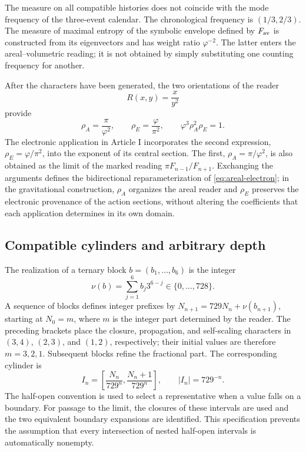 The measure on all compatible histories does not coincide with the mode frequency of the three-event calendar. The chronological frequency is \((1/3,2/3)\). The measure of maximal entropy of the symbolic envelope defined by \(F_{\rm av}\) is constructed from its eigenvectors and has weight ratio \(\varphi^{-2}\). The latter enters the areal--volumetric reading; it is not obtained by simply substituting one counting frequency for another.

After the characters have been generated, the two orientations of the reader
\[
 R(x,y)=\frac{x}{y^2}
\]
provide
\begin{equation}
 \rho_A=\frac\pi{\varphi^2},\qquad
 \rho_E=\frac\varphi{\pi^2},\qquad
 \varphi^3\rho_A^2\rho_E=1.
 \label{eq:areal-electron}
\end{equation}
The electronic application in Article I incorporates the second expression,
\(\rho_E=\varphi/\pi^2\), into the exponent of its central section. The first,
\(\rho_A=\pi/\varphi^2\), is also obtained as the limit of the marked
reading \(\pi F_{n-1}/F_{n+1}\). Exchanging the arguments defines the
bidirectional reparameterization of \eqref{eq:areal-electron}; in the
gravitational construction, \(\rho_A\) organizes the areal reader and
\(\rho_E\) preserves the electronic provenance of the action sections,
without altering the coefficients that each application determines in its own domain.



\subsection{Compatible cylinders and arbitrary depth}

The realization of a ternary block \(b=(b_1,\ldots,b_6)\) is the integer
\[
 \nu(b)=\sum_{j=1}^6b_j3^{6-j}\in\{0,\ldots,728\}.
\]
A sequence of blocks defines integer prefixes by \(N_{n+1}=729N_n+\nu(b_{n+1})\), starting at \(N_0=m\), where \(m\) is the integer part determined by the reader. The preceding brackets place the closure, propagation, and self-scaling characters in \((3,4)\), \((2,3)\), and \((1,2)\), respectively; their initial values are therefore \(m=3,2,1\). Subsequent blocks refine the fractional part. The corresponding cylinder is
\begin{equation}
 I_n=\left[\frac{N_n}{729^n},\frac{N_n+1}{729^n}\right],
 \qquad |I_n|=729^{-n}.
 \label{eq:cilindro}
\end{equation}
The half-open convention is used to select a representative when a value falls on a boundary. For passage to the limit, the closures of these intervals are used and the two equivalent boundary expansions are identified. This specification prevents the assumption that every intersection of nested half-open intervals is automatically nonempty.


